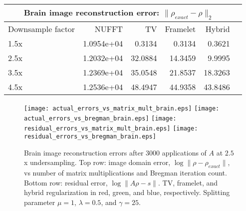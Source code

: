 \documentclass[12pt]{amsart}
\theoremstyle{remark}
\begin{document}
\begin{center}
\begin{tabular}{| p{2cm} || r | r | r | r | r | }
  \hline
  \multicolumn{5}{|c|}{Brain image reconstruction error: $\| \rho_{exact} - \rho \|_2$}\\
  \hline                       
  Downsample factor & NUFFT & TV & Framelet & Hybrid \\ \hline
  1.5x & 1.0954e+04 & 0.3134 & 0.3134 & 0.3621 \\
  2.5x & 1.2032e+04 & 32.0884 & 14.3459 & 9.9995 \\
  3.5x & 1.2369e+04 & 35.0548 & 21.8537 & 18.3263 \\
  4.5x & 1.2536e+04 & 48.4947 & 44.9358 & 43.8486 \\
  \hline  
\end{tabular}
\end{center}


\begin{center}
\begin{figure}[h!]
\texttt{[image: actual\_errors\_vs\_matrix\_mult\_brain.eps]}
\texttt{[image: actual\_errors\_vs\_bregman\_brain.eps]}
\linebreak
\texttt{[image: residual\_errors\_vs\_matrix\_mult\_brain.eps]}
\texttt{[image: residual\_errors\_vs\_bregman\_brain.eps]}
\caption{Brain image reconstruction errors after $3000$ applications of $A$ at $2.5$x undersampling. Top row: image domain error, $\log \| \rho - \rho_{exact}\|$, vs number of matrix multiplications and Bregman iteration count. Bottom row: residual error, $\log \| A\rho - s \|$. TV, framelet, and hybrid regularization in red, green, and blue, respectively. Splitting parameter $\mu=1$, $\lambda=0.5$, and $\gamma=25$.}
\end{figure}
\end{center}








\end{document}
